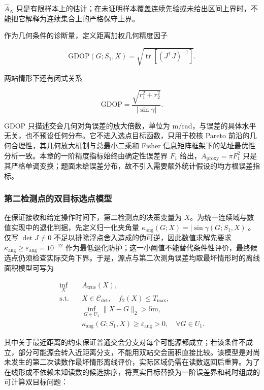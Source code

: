 $\widehat A_N$ 只是有限样本上的估计；在未证明样本覆盖连续先验或未给出区间上界时，不能把它解释为连续集合上的严格保守上界。

作为几何条件的诊断量，定义距离加权几何精度因子

\[
\mathrm{GDOP}(G;S_1,X)
=
\sqrt{
\operatorname{tr}
\left[
\left(J^{\mathsf T}J\right)^{-1}
\right]
}.
\]

两站情形下还有闭式关系

\[
\mathrm{GDOP}
=
\frac{\sqrt{r_1^2+r_2^2}}{|\sin\gamma|}.
\]

$\mathrm{GDOP}$ 只描述交会几何对角误差的放大倍数，单位为 $\mathrm{m/rad}$，与误差的具体水平无关，也不预设任何分布。它不进入选点目标函数，只用于校核 Pareto 前沿的几何合理性，其几何放大机制与总最小二乘和 Fisher 信息矩阵框架下的站址最优性分析一致\cite{dogancay2005,bishop2010}。本章的一阶精度指标始终由确定性误差界 $F_1$ 给出，$A_{\mathrm{proxy}}=\pi F_1^2$ 只是其严格单调变换；题面未给误差分布，故不引入需要额外统计假设的均方根误差指标。

\subsubsection{第二检测点的双目标选点模型}

在保证接收和给定操作时间下，第二检测点的决策变量为 $X$。为统一连续域与数值实现中的退化判据，先定义归一化夹角量 $\kappa_{\mathrm{ang}}(G;X)=|\sin\gamma(G;S_1,X)|$。仅写 $\det J\ne0$ 不足以排除浮点舍入造成的伪可逆，因此数值求解先要求 $\kappa_{\mathrm{ang}}\ge\varepsilon_{\mathrm{ang}}=10^{-12}$ 作为最低退化防护；这一小阈值不能替代条件性评价，最终候选点仍须检查实际交角下界。于是，源点与第二次测角误差均取最坏情形时的离线面积模型可写为

\[
\begin{aligned}
\inf_{X}\quad & A_{\mathrm{true}}(X),\\
\text{s.t.}\quad
& X\in\mathcal C_{\det},\quad f_2(X)\le T_{\max},\\
& \inf_{G\in U_1}\lVert X-G\rVert_2>5\mathrm{m},\\
& \kappa_{\mathrm{ang}}(G;S_1,X)\ge\varepsilon_{\mathrm{ang}}>0,
\quad \forall G\in U_1.
\end{aligned}
\]

其中关于最近距离的约束保证普通交会分支对每个可能源都成立；若该条件不成立，部分可能源会转入近距离分支，不能用双站交会面积直接比较。该模型是对尚未发生的第二次读数作最坏情形离线评价，实际区域仍需在读数返回后重算。为了在线形成不依赖未知读数的候选排序，将真实目标替换为一阶误差界和耗时组成的可计算双目标问题：

